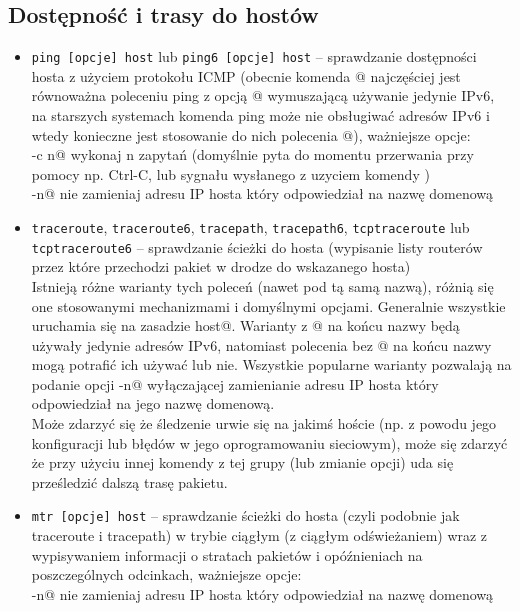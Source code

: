 \documentclass{pdfBooklets}
\begin{document}
\subsection{Dostępność i trasy do hostów}
\begin{itemize}
	\item \Verb#ping [opcje] host# lub \Verb#ping6 [opcje] host# –
		sprawdzanie dostępności hosta z użyciem protokołu ICMP
		(obecnie komenda @ najczęściej jest równoważna poleceniu ping z opcją @ wymuszającą używanie jedynie IPv6,
		na starszych systemach komenda ping może nie obsługiwać adresów IPv6 i wtedy konieczne jest stosowanie do nich polecenia @),
		ważniejsze opcje:\\
		\Verb@-c n@ wykonaj n zapytań (domyślnie pyta do momentu przerwania przy pomocy np. Ctrl-C, lub sygnału wysłanego z uzyciem komendy \Verb@kill@)\\
		\Verb@-n@ nie zamieniaj adresu IP hosta który odpowiedział na nazwę domenową
		
	\item \Verb#traceroute#, \Verb#traceroute6#, \Verb#tracepath#, \Verb#tracepath6#, \Verb#tcptraceroute# lub \Verb#tcptraceroute6# – 
		sprawdzanie ścieżki do hosta (wypisanie listy routerów przez które przechodzi pakiet w drodze do wskazanego hosta)\\
		Istnieją różne warianty tych poleceń (nawet pod tą samą nazwą), różnią się one stosowanymi mechanizmami i domyślnymi opcjami.
		Generalnie wszystkie uruchamia się na zasadzie \Verb@polecenie [opcje] host@.
		Warianty z @ na końcu nazwy będą używały jedynie adresów IPv6, natomiast polecenia bez @ na końcu nazwy mogą potrafić ich używać lub nie.
		Wszystkie popularne warianty pozwalają na podanie opcji \Verb@-n@ wyłączającej zamienianie adresu IP hosta który odpowiedział na jego nazwę domenową.\\
		Może zdarzyć się że śledzenie urwie się na jakimś hoście (np. z powodu jego konfiguracji lub błędów w jego oprogramowaniu sieciowym),
		może się zdarzyć że przy użyciu innej komendy z tej grupy (lub zmianie opcji) uda się prześledzić dalszą trasę pakietu.
	\item \Verb#mtr [opcje] host# –
		sprawdzanie ścieżki do hosta (czyli podobnie jak traceroute i tracepath) w trybie ciągłym (z ciągłym odświeżaniem)
		wraz z wypisywaniem informacji o stratach pakietów i opóźnieniach na poszczególnych odcinkach, ważniejsze opcje:\\
		\Verb@-n@ nie zamieniaj adresu IP hosta który odpowiedział na nazwę domenową
	

\end{itemize}
\end{document}
